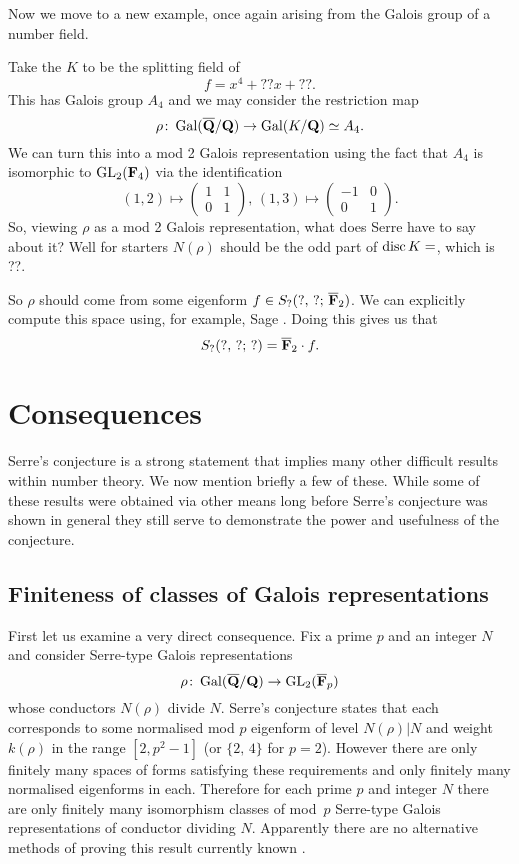 \documentclass[a4paper,12pt]{article}
\begin{document}
Now we move to a new example, once again arising from the Galois group of a number field.

\begin{ex}
Take the $K$ to be the splitting field of
\[
f = x^4 + ??x + ??.
\]
This has Galois group $A_4$ and we may consider the restriction map
\[
\rho\colon \operatorname{Gal}(\overline{\mathbf{Q}}/\mathbf{Q}) \to \operatorname{Gal}(K/\mathbf{Q}) \simeq A_4.
\]
We can turn this into a mod 2 Galois representation using the fact that $A_4$ is isomorphic to $\operatorname{GL}_2(\mathbf{F}_4)$ via the identification %
\[
(1, 2) \mapsto \begin{pmatrix} 1 & 1 \\ 0 & 1 \end{pmatrix},\,
(1, 3) \mapsto \begin{pmatrix} -1 & 0 \\ 0 & 1 \end{pmatrix}.
\]
So, viewing $\rho$ as a mod 2 Galois representation, what does Serre have to say about it?
Well for starters $N(\rho)$ should be the odd part of $\operatorname{disc} K = $, which is ??.

So $\rho$ should come from some eigenform $f \in S_?(?,\,?;\,\overline{\mathbf{F}}_2)$.
We can explicitly compute this space using, for example, Sage \cite{Sage}.
Doing this gives us that
\[
S_?(?,\,?;\,?) = \overline{\mathbf{F}}_2 \cdot f.
\]

\end{ex}


\section{Consequences}
Serre's conjecture is a strong statement that implies many other difficult results within number theory.
We now mention briefly a few of these.
While some of these results were obtained via other means long before Serre's conjecture was shown in general they still serve to demonstrate the power and usefulness of the conjecture.


\subsection{Finiteness of classes of Galois representations}
First let us examine a very direct consequence.
Fix a prime $p$ and an integer $N$ and consider Serre-type Galois representations
\[
\rho\colon \operatorname{Gal}(\overline{\mathbf{Q}}/\mathbf{Q}) \to \operatorname{GL}_2(\overline{\mathbf{F}}_p)
\]
whose conductors $N(\rho)$ divide $N$.
Serre's conjecture states that each corresponds to some normalised mod $p$ eigenform of level $N(\rho)|N$ and weight $k(\rho)$ in the range $[2,p^2-1]$ (or $\{2,\,4\}$ for $p=2$).
However there are only finitely many spaces of forms satisfying these requirements and only finitely many normalised eigenforms in each.
Therefore for each prime $p$ and integer $N$ there are only finitely many isomorphism classes of mod~$p$ Serre-type Galois representations of conductor dividing $N$.
Apparently there are no alternative methods of proving this result currently known \cite{WieseMod}.
\end{document}
